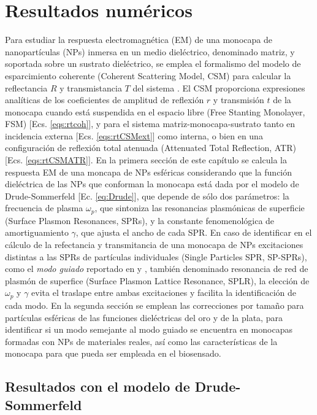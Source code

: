\chapter{Resultados numéricos}

Para estudiar la respuesta electromagnética (EM) de una monocapa de nanopartículas (NPs) inmersa en un medio dieléctrico, denominado matriz, y soportada sobre un sustrato dieléctrico, se emplea el formalismo del modelo de esparcimiento coherente (Coherent Scattering Model, CSM) para calcular la reflectancia $R$ y transmistancia $T$ del sistema \cite{reyes2018analytical}. El CSM proporciona expresiones analíticas de los coeficientes de amplitud de reflexión $r$ y transmisión $t$ de la monocapa cuando está suspendida en el espacio libre (Free Stanting Monolayer, FSM) [Ecs. \eqref{eqs:rtcoh}], y para el sistema matriz-monocapa-sustrato tanto en incidencia externa [Ecs. \eqref{eqs:rtCSMext}] como interna, o bien en una configuración de reflexión total atenuada  (Attenuated Total Reflection, ATR) [Ecs. \eqref{eqs:rtCSMATR}]. En la primera sección de este capítulo se calcula la respuesta EM de una moncapa de NPs esféricas considerando que la función dieléctrica de las NPs que conforman la monocapa está dada por el modelo de Drude-Sommerfeld [Ec. \eqref{eq:Drude}], que depende de sólo dos parámetros: la frecuencia de plasma $\omega_p$, que sintoniza las resonancias plasmónicas de superficie (Surface Plasmon Resonances, SPRs), y la constante fenomenológica de amortiguamiento $\gamma$, que ajusta el ancho de cada SPR. En caso de identificar en el cálculo de la refectancia y transmitancia de una monocapa de NPs excitaciones distintas a las  SPRs de partículas individuales (Single Particles SPR, SP-SPRs), como el \emph{modo guiado} reportado en \cite{kabashin2009plasmonic} y \cite{danilov2018ultra}, también denominado resonancia de red de plasmón de superfice (Surface Plasmon Lattice Resonance, SPLR), la elección de $\omega_p$ y $\gamma$ evita el traslape entre ambas excitaciones y facilita la identificación de cada modo. En la segunda sección se emplean las correcciones por tamaño para partículas esféricas de las funciones dieléctricas del oro y de la plata, para identificar si un modo semejante al modo guiado se encuentra en monocapas formadas con NPs de materiales reales, así como las  características de la monocapa para que pueda ser empleada en el biosensado.

\section{Resultados con el modelo de Drude-Sommerfeld}
\label{section:Drude}


